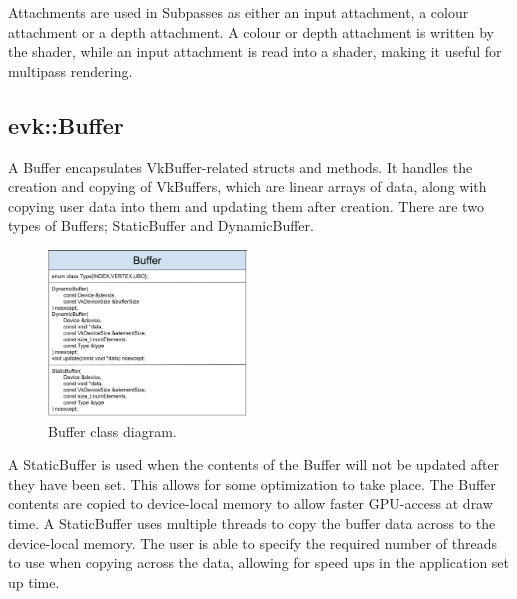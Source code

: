 \documentclass[12pt]{report}
\newcommand{\figurewidth}{0.55\textwidth}
\newcommand{\imagewidth}{0.47\textwidth}
\theoremstyle{definition}
\begin{document}
        Attachments are used in Subpasses as either an input attachment, a
        colour attachment or a depth attachment. A colour or depth attachment
        is written by the shader, while an input attachment is read into a
        shader, making it useful for multipass rendering.

      \subsection{evk::Buffer}

        A Buffer encapsulates VkBuffer-related structs and methods. It handles
        the creation and copying of VkBuffers, which are linear arrays of
        data, along with copying user data into them and updating them after
        creation. There are two types of Buffers; StaticBuffer and
        DynamicBuffer. \\

        \begin{figure}
          \centering
          \includegraphics[width=\imagewidth]{images/class_buffer.png}
          \caption{Buffer class diagram.}
          \label{fig:class_buffer}  
        \end{figure}

        A StaticBuffer is used when the contents of the Buffer will not be
        updated after they have been set. This allows for some optimization
        to take place. The Buffer contents are copied to device-local memory
        to allow faster GPU-access at draw time. A StaticBuffer uses multiple threads
        to copy the buffer data across to the device-local memory. The user is able
        to specify the required number of threads to use when copying across the data,
        allowing for speed ups in the application set up time. \\
\end{document}
